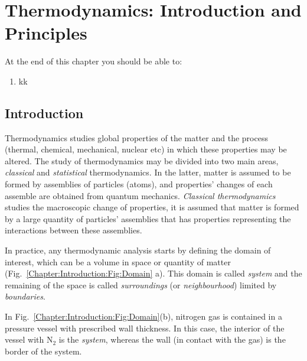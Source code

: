 
\chapter{Thermodynamics: Introduction and Principles}\label{Chapter:Introduction}
   \begin{shaded}
      \noindent
      At the end of this chapter you should be able to:
        \begin{enumerate}
           \item kk
        \end{enumerate}
   \end{shaded}

\section{Introduction}\label{Chapter:Introduction:Section:Introduction}
Thermodynamics studies global properties of the matter and the process (\eg thermal, chemical, mechanical, nuclear etc) in which these properties may be altered. The study of thermodynamics may be divided into two main areas, {\it classical} and {\it statistical} thermodynamics. In the latter, matter is assumed to be formed by assemblies of particles (\ie atoms), and properties' changes of each assemble are obtained from quantum mechanics. {\it Classical thermodynamics} studies the macroscopic change of properties, \ie it is assumed that matter is formed by a large quantity of particles' assemblies that has properties representing the interactions between these assemblies. 

In practice, any thermodynamic analysis starts by defining the domain of interest, which can be a volume in space or quantity of matter (Fig.~\ref{Chapter:Introduction:Fig:Domain} a). This domain is called {\it system} and the remaining of the space is called {\it surroundings} (or {\it neighbourhood}) limited by {\it boundaries}. 


In Fig.~\ref{Chapter:Introduction:Fig:Domain}(b), nitrogen gas is contained in a pressure vessel with prescribed wall thickness. In this case, the interior of the vessel with N$_{2}$ is the {\it system}, whereas the wall (in contact with the gas) is the border of the system. 




